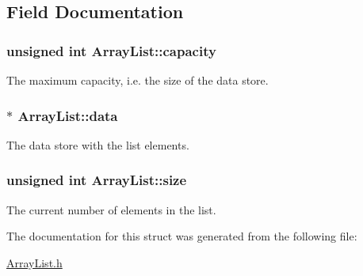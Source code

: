 \subsection{Field Documentation}
\hypertarget{structArrayList_ad9b336b3ba505e3ed41e956a41e4ae87}{
\subsubsection[{capacity}]{\setlength{\rightskip}{0pt plus 5cm}unsigned int Array\-List\-::capacity}}\label{structArrayList_ad9b336b3ba505e3ed41e956a41e4ae87}
The maximum capacity, i.\-e. the size of the data store. \hypertarget{structArrayList_ae2c5fff51ffd10f506fec17a04931f2b}{
\subsubsection[{data}]{$\ast$ Array\-List\-::data}}\label{structArrayList_ae2c5fff51ffd10f506fec17a04931f2b}
The data store with the list elements. \hypertarget{structArrayList_a2dd219b2d42d20b6abc50b8ba989dd3d}{
\subsubsection[{size}]{\setlength{\rightskip}{0pt plus 5cm}unsigned int Array\-List\-::size}}\label{structArrayList_a2dd219b2d42d20b6abc50b8ba989dd3d}
The current number of elements in the list. 

The documentation for this struct was generated from the following file\-:\begin{DoxyCompactItemize}
\item 
\hyperlink{ArrayList_8h}{Array\-List.\-h}\end{DoxyCompactItemize}
